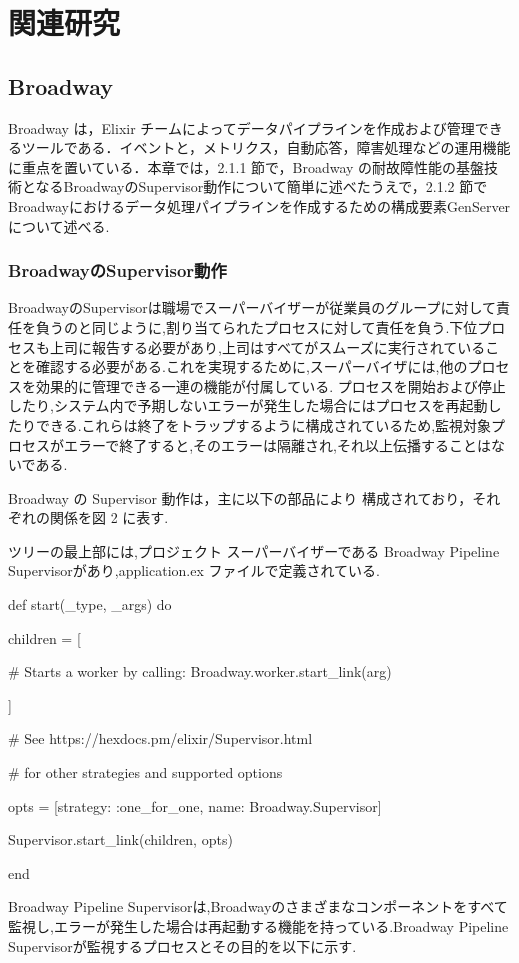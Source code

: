 \documentclass[a4paper]{jreport}	%
\begin{document}
\chapter{関連研究}
\section{Broadway}
Broadway は，Elixir チームによってデータパイプラインを作成および管理できるツールである．イベントと，メトリクス，自動応答，障害処理などの運用機能に重点を置いている\cite{D}．本章では，2.1.1 節で，Broadway の耐故障性能の基盤技術となるBroadwayのSupervisor動作について簡単に述べたうえで，2.1.2 節で Broadwayにおけるデータ処理パイプラインを作成するための構成要素GenServerについて述べる.
\subsection{BroadwayのSupervisor動作}
BroadwayのSupervisorは職場でスーパーバイザーが従業員のグループに対して責任を負うのと同じように,割り当てられたプロセスに対して責任を負う.下位プロセスも上司に報告する必要があり,上司はすべてがスムーズに実行されていることを確認する必要がある.これを実現するために,スーパーバイザには,他のプロセスを効果的に管理できる一連の機能が付属している. プロセスを開始および停止したり,システム内で予期しないエラーが発生した場合にはプロセスを再起動したりできる.これらは終了をトラップするように構成されているため,監視対象プロセスがエラーで終了すると,そのエラーは隔離され,それ以上伝播することはないである. 

Broadway の Supervisor 動作は，主に以下の部品により 構成されており，それぞれの関係を図 2 に表す.

ツリーの最上部には,プロジェクト スーパーバイザーである Broadway Pipeline Supervisorがあり,application.ex ファイルで定義されている.

def start(\_type, \_args) do 

children = [

    \# Starts a worker by calling: Broadway.worker.start\_link(arg)
    
    
]

 \# See https://hexdocs.pm/elixir/Supervisor.html

 \# for other strategies and supported options

opts = [strategy: :one\_for\_one, name: Broadway.Supervisor] 

Supervisor.start\_link(children, opts)

end

Broadway Pipeline Supervisorは,Broadwayのさまざまなコンポーネントをすべて監視し,エラーが発生した場合は再起動する機能を持っている.Broadway Pipeline Supervisorが監視するプロセスとその目的を以下に示す.
\end{document}
